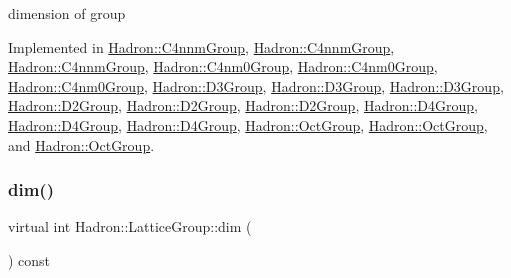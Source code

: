 dimension of group 

Implemented in \mbox{\hyperlink{structHadron_1_1C4nnmGroup_ab40f44381ee83db2364e43bc2c3521e4}{Hadron\+::\+C4nnm\+Group}}, \mbox{\hyperlink{structHadron_1_1C4nnmGroup_ab40f44381ee83db2364e43bc2c3521e4}{Hadron\+::\+C4nnm\+Group}}, \mbox{\hyperlink{structHadron_1_1C4nnmGroup_ab40f44381ee83db2364e43bc2c3521e4}{Hadron\+::\+C4nnm\+Group}}, \mbox{\hyperlink{structHadron_1_1C4nm0Group_adc1a59b08c4fafae324e82e8ded86919}{Hadron\+::\+C4nm0\+Group}}, \mbox{\hyperlink{structHadron_1_1C4nm0Group_adc1a59b08c4fafae324e82e8ded86919}{Hadron\+::\+C4nm0\+Group}}, \mbox{\hyperlink{structHadron_1_1C4nm0Group_adc1a59b08c4fafae324e82e8ded86919}{Hadron\+::\+C4nm0\+Group}}, \mbox{\hyperlink{structHadron_1_1D3Group_a90114a92f0c05cdfd8ff56e33606d3c3}{Hadron\+::\+D3\+Group}}, \mbox{\hyperlink{structHadron_1_1D3Group_a90114a92f0c05cdfd8ff56e33606d3c3}{Hadron\+::\+D3\+Group}}, \mbox{\hyperlink{structHadron_1_1D3Group_a90114a92f0c05cdfd8ff56e33606d3c3}{Hadron\+::\+D3\+Group}}, \mbox{\hyperlink{structHadron_1_1D2Group_a937ab7d9b4b21da1331b0c85728f7db9}{Hadron\+::\+D2\+Group}}, \mbox{\hyperlink{structHadron_1_1D2Group_a937ab7d9b4b21da1331b0c85728f7db9}{Hadron\+::\+D2\+Group}}, \mbox{\hyperlink{structHadron_1_1D2Group_a937ab7d9b4b21da1331b0c85728f7db9}{Hadron\+::\+D2\+Group}}, \mbox{\hyperlink{structHadron_1_1D4Group_a5969c3afe94d4c6ada166f7dc161a355}{Hadron\+::\+D4\+Group}}, \mbox{\hyperlink{structHadron_1_1D4Group_a5969c3afe94d4c6ada166f7dc161a355}{Hadron\+::\+D4\+Group}}, \mbox{\hyperlink{structHadron_1_1D4Group_a5969c3afe94d4c6ada166f7dc161a355}{Hadron\+::\+D4\+Group}}, \mbox{\hyperlink{structHadron_1_1OctGroup_a1db49add38b9263bfd536b3da0cc1566}{Hadron\+::\+Oct\+Group}}, \mbox{\hyperlink{structHadron_1_1OctGroup_a1db49add38b9263bfd536b3da0cc1566}{Hadron\+::\+Oct\+Group}}, and \mbox{\hyperlink{structHadron_1_1OctGroup_a1db49add38b9263bfd536b3da0cc1566}{Hadron\+::\+Oct\+Group}}.

\mbox{\label{structHadron_1_1LatticeGroup_abd8415698323796ef6a8605796ee3bea}} 
\subsubsection{\texorpdfstring{dim()}{dim()}\hspace{0.1cm}{\footnotesize\ttfamily [2/3]}}
{\footnotesize\ttfamily virtual int Hadron\+::\+Lattice\+Group\+::dim (\begin{DoxyParamCaption}{ }\end{DoxyParamCaption}) const\hspace{0.3cm}{\ttfamily [pure virtual]}}

